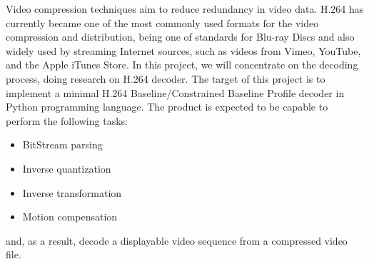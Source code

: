 \documentclass[../main.tex]{subfiles}
\begin{document}
Video compression techniques aim to reduce redundancy in video data. 
H.264  has currently became one of the most commonly used formats for the video compression and distribution, 
being one of standards for Blu-ray Discs and also widely used by streaming Internet sources, 
such as videos from Vimeo, YouTube, and the Apple iTunes Store. 
In this project, we will concentrate on the decoding process, doing research on H.264 decoder.
The target of this project is to implement a minimal H.264 Baseline/Constrained Baseline Profile decoder in Python programming language. 
The product is expected to be capable to perform the following tasks:

\begin{itemize}
\item BitStream parsing 
\item Inverse quantization
\item Inverse transformation
\item Motion compensation
\end{itemize}

and, as a result, decode a displayable video sequence from a compressed video file.
\end{document}

